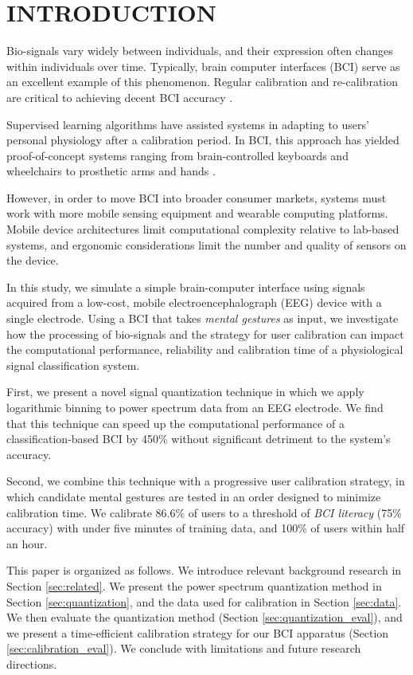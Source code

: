 \section{\uppercase{Introduction}}
\label{sec:introduction}

\noindent Bio-signals vary widely between individuals, and their expression often changes within individuals over time. Typically, brain computer interfaces (BCI) serve as an excellent example of this phenomenon. Regular calibration and re-calibration are critical to achieving decent BCI accuracy \cite{dornhege_toward_2007,mcfarland_brain-computer_2011}.

Supervised learning algorithms have assisted systems in adapting to users' personal physiology after a calibration period. In BCI, this approach has yielded proof-of-concept systems ranging from brain-controlled keyboards and wheelchairs to prosthetic arms and hands \cite{blankertz_note_2007,millan_combining_2010,d._mattia_brain_2011,hill_practical_2014,campbell_neurophone:_2010}. 

However, in order to move BCI into broader consumer markets, systems must work with more mobile sensing equipment and wearable computing platforms. Mobile device architectures limit computational complexity relative to lab-based systems, and ergonomic considerations limit the number and quality of sensors on the device. 

In this study, we simulate a simple brain-computer interface using signals acquired from a low-cost, mobile electroencephalograph (EEG) device with a single electrode. Using a BCI that takes \textit{mental gestures} as input, we investigate how the processing of bio-signals and the strategy for user calibration can impact the computational performance, reliability and calibration time of a physiological signal classification system. 

First, we present a novel signal quantization technique in which we apply logarithmic binning to power spectrum data from an EEG electrode. We find that this technique can speed up the computational performance of a classification-based BCI by 450\% without significant detriment to the system's accuracy. 

Second, we combine this technique with a progressive user calibration strategy, in which candidate mental gestures are tested in an order designed to minimize calibration time. We calibrate 86.6\% of users to a threshold of \textit{BCI literacy} (75\% accuracy) \cite{vidaurre_towards_2010} with under five minutes of training data, and 100\% of users within half an hour. 

This paper is organized as follows. We introduce relevant background research in Section \ref{sec:related}. We present the power spectrum quantization method in Section \ref{sec:quantization}, and the data used for calibration in Section \ref{sec:data}. We then evaluate the quantization method (Section \ref{sec:quantization_eval}), and we present a time-efficient calibration strategy for our BCI apparatus (Section \ref{sec:calibration_eval}). We conclude with limitations and future research directions.
